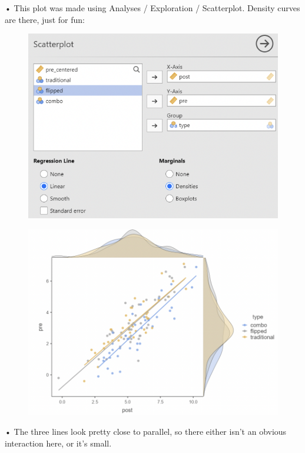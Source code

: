 \documentclass[
  letterpaper,
  DIV=11,
  numbers=noendperiod]{scrreprt}
\begin{document}
• This plot was made using Analyses / Exploration / Scatterplot. Density
curves are there, just for fun:

\begin{figure}

\includegraphics[width=4.45833in,height=\textheight]{images/Mod5_19.png} \hfill{}

\end{figure}

\begin{figure}

\hfill{} \includegraphics[width=4.97917in,height=\textheight]{images/Mod5_20.png}

\end{figure}

• The three lines look pretty close to parallel, so there either isn't
an obvious interaction here, or it's small.
\end{document}
